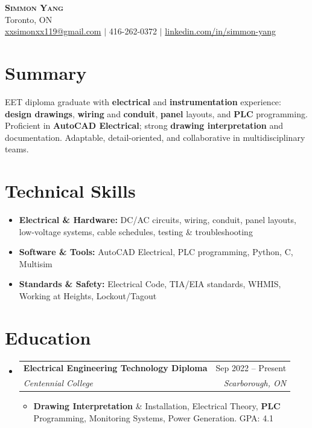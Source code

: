 \documentclass[letterpaper,11pt]{article}
\makeatletter
\newcommand{\resumeItem}[1]{\item\small{{#1 \vspace{-2pt}}}}
\newcommand{\resumeSubheading}[4]{
  \vspace{-4pt}\item
    \begin{tabular*}{0.97\textwidth}[t]{l@{\extracolsep{\fill}}r}
      \textbf{#1} & #2 \\
      \textit{\small #3} & \textit{\small #4} \\
    \end{tabular*}\vspace{-8pt}
}
\newcommand{\resumeSubHeadingListStart}{\begin{itemize}[leftmargin=0.15in, label={}]}
\newcommand{\resumeSubHeadingListEnd}{\end{itemize}}
\newcommand{\resumeItemListStart}{\begin{itemize}}
\newcommand{\resumeItemListEnd}{\end{itemize}\vspace{-5pt}}
\makeatother
\begin{document}
\begin{center}
    \textbf{\Huge \scshape Simmon Yang} \\ \vspace{1pt}
    Toronto, ON \\ 
    \href{mailto:xxsimonxx119@gmail.com}{xxsimonxx119@gmail.com} $|$ 416-262-0372 $|$ 
    \href{https://www.linkedin.com/in/simmon-yang/}{linkedin.com/in/simmon-yang}
\end{center}

\section{Summary}
EET diploma graduate with \textbf{electrical} and \textbf{instrumentation} experience: \textbf{design drawings}, \textbf{wiring} and \textbf{conduit}, \textbf{panel} layouts, and \textbf{PLC} programming. Proficient in \textbf{AutoCAD Electrical}; strong \textbf{drawing interpretation} and documentation. Adaptable, detail-oriented, and collaborative in multidisciplinary teams.

\section{Technical Skills}
\begin{itemize}[leftmargin=0.15in]
  \item \textbf{Electrical \& Hardware:} DC/AC circuits, wiring, conduit, panel layouts, low-voltage systems, cable schedules, testing \& troubleshooting
  \item \textbf{Software \& Tools:} AutoCAD Electrical, PLC programming, Python, C, Multisim
  \item \textbf{Standards \& Safety:} Electrical Code, TIA/EIA standards, WHMIS, Working at Heights, Lockout/Tagout
\end{itemize}

\section{Education}
\resumeSubHeadingListStart
\resumeSubheading
  {Electrical Engineering Technology Diploma}{Sep 2022 -- Present}
  {Centennial College}{Scarborough, ON}
\resumeItemListStart
  \resumeItem{\textbf{Drawing Interpretation} \& Installation, Electrical Theory, \textbf{PLC} Programming, Monitoring Systems, Power Generation. GPA: 4.1}
\resumeItemListEnd
\resumeSubHeadingListEnd
\end{document}
